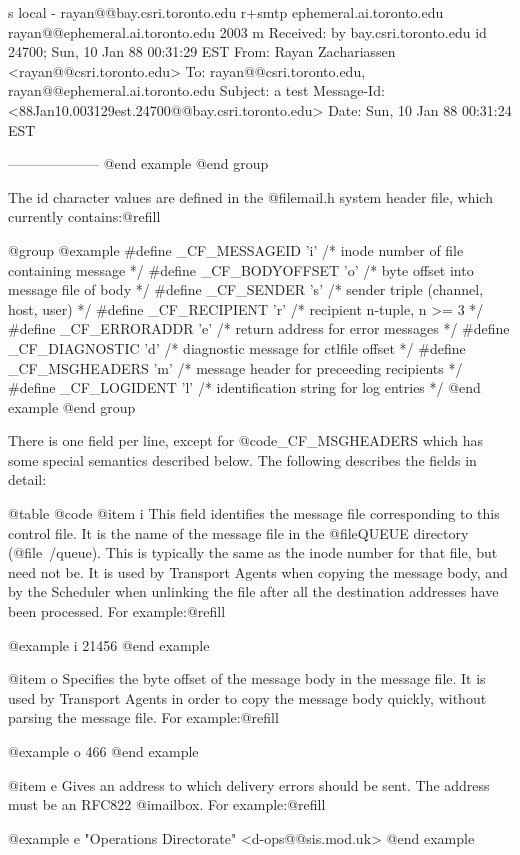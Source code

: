 {{s local - rayan@@bay.csri.toronto.edu
r+smtp ephemeral.ai.toronto.edu rayan@@ephemeral.ai.toronto.edu 2003
m
Received: by bay.csri.toronto.edu id 24700; Sun, 10 Jan 88 00:31:29 EST
From:   Rayan Zachariassen <rayan@@csri.toronto.edu>
To:     rayan@@csri.toronto.edu, rayan@@ephemeral.ai.toronto.edu
Subject: a test
Message-Id: <88Jan10.003129est.24700@@bay.csri.toronto.edu>
Date:   Sun, 10 Jan 88 00:31:24 EST

--------------------
@end example
@end group

The id character values are defined in the @file{mail.h} system header file,
which currently contains:@refill

@group
@example
#define _CF_MESSAGEID  'i' /* inode number of file containing message */
#define _CF_BODYOFFSET 'o' /* byte offset into message file of body */
#define _CF_SENDER     's' /* sender triple (channel, host, user) */
#define _CF_RECIPIENT  'r' /* recipient n-tuple, n >= 3 */
#define _CF_ERRORADDR  'e' /* return address for error messages */
#define _CF_DIAGNOSTIC 'd' /* diagnostic message for ctlfile offset */
#define _CF_MSGHEADERS 'm' /* message header for preceeding recipients */
#define _CF_LOGIDENT   'l' /* identification string for log entries */
@end example
@end group

There is one field per line, except for @code{_CF_MSGHEADERS} which has some
special semantics described below.  The following describes the fields in
detail:

@table @code
@item i
This field identifies the message file corresponding to this control file.
It is the name of the message file in the @file{QUEUE} directory
(@file{~/queue}).  This is typically the same as the inode number for that
file, but need not be.  It is used by Transport Agents when copying the
message body, and by the Scheduler when unlinking the file after all the
destination addresses have been processed.  For example:@refill

@example
i 21456
@end example

@item o
Specifies the byte offset of the message body in the message file.  It is
used by Transport Agents in order to copy the message body quickly, without
parsing the message file.  For example:@refill

@example
o 466
@end example

@item e
Gives an address to which delivery errors should be sent.  The address
must be an RFC822 @i{mailbox}.  For example:@refill

@example
e "Operations Directorate" <d-ops@@sis.mod.uk>
@end example

}}
